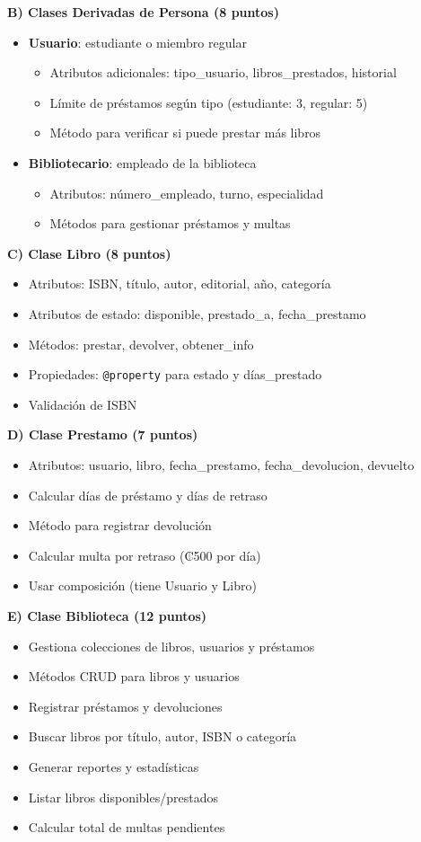\documentclass[11pt,letterpaper]{article}
\begin{document}
\textbf{B) Clases Derivadas de Persona (8 puntos)}
\begin{itemize}
    \item \textbf{Usuario}: estudiante o miembro regular
    \begin{itemize}
        \item Atributos adicionales: tipo\_usuario, libros\_prestados, historial
        \item Límite de préstamos según tipo (estudiante: 3, regular: 5)
        \item Método para verificar si puede prestar más libros
    \end{itemize}
    \item \textbf{Bibliotecario}: empleado de la biblioteca
    \begin{itemize}
        \item Atributos: número\_empleado, turno, especialidad
        \item Métodos para gestionar préstamos y multas
    \end{itemize}
\end{itemize}

\textbf{C) Clase Libro (8 puntos)}
\begin{itemize}
    \item Atributos: ISBN, título, autor, editorial, año, categoría
    \item Atributos de estado: disponible, prestado\_a, fecha\_prestamo
    \item Métodos: prestar, devolver, obtener\_info
    \item Propiedades: \texttt{@property} para estado y días\_prestado
    \item Validación de ISBN
\end{itemize}

\textbf{D) Clase Prestamo (7 puntos)}
\begin{itemize}
    \item Atributos: usuario, libro, fecha\_prestamo, fecha\_devolucion, devuelto
    \item Calcular días de préstamo y días de retraso
    \item Método para registrar devolución
    \item Calcular multa por retraso (₡500 por día)
    \item Usar composición (tiene Usuario y Libro)
\end{itemize}

\textbf{E) Clase Biblioteca (12 puntos)}
\begin{itemize}
    \item Gestiona colecciones de libros, usuarios y préstamos
    \item Métodos CRUD para libros y usuarios
    \item Registrar préstamos y devoluciones
    \item Buscar libros por título, autor, ISBN o categoría
    \item Generar reportes y estadísticas
    \item Listar libros disponibles/prestados
    \item Calcular total de multas pendientes
\end{itemize}
\end{document}
